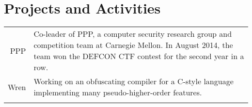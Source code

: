 \documentclass{article}
\begin{document}
	\section{Projects and Activities}
	\begin{tabular}{r|p{}}
		PPP & \footnotesize{Co-leader of PPP, a computer security research group and competition team at
			Carnegie Mellon. In August 2014, the team won the DEFCON CTF contest for the second year 
			in a row.} \\
		Wren & \footnotesize{Working on an obfuscating compiler for a C-style language implementing many pseudo-higher-order features.} \\
		\multicolumn{2}{c}{}\\
	\end{tabular}
\end{document}
